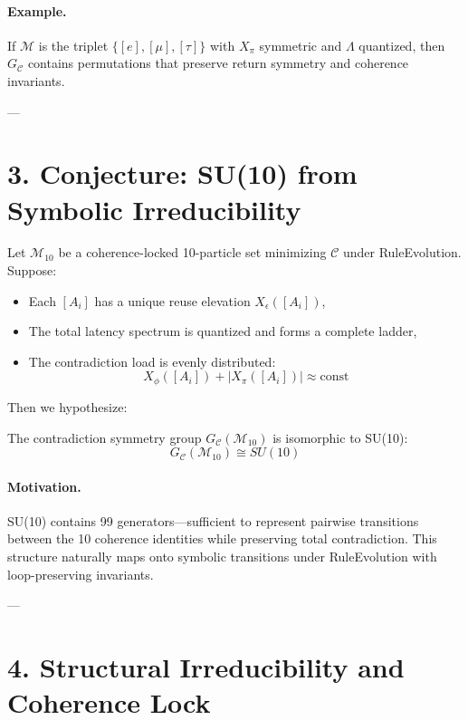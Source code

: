 \paragraph{Example.}
If $\mathcal{M}$ is the triplet $\{[e], [\mu], [\tau]\}$ with $X_\pi$ symmetric and $\Lambda$ quantized, then $G_\mathcal{C}$ contains permutations that preserve return symmetry and coherence invariants.

---

\section{3. Conjecture: SU(10) from Symbolic Irreducibility}
\label{sec:su10-conjecture}

Let $\mathcal{M}_{10}$ be a coherence-locked 10-particle set minimizing $\mathcal{C}$ under RuleEvolution. Suppose:

\begin{itemize}
  \item Each $[A_i]$ has a unique reuse elevation $X_\epsilon([A_i])$,
  \item The total latency spectrum is quantized and forms a complete ladder,
  \item The contradiction load is evenly distributed: 
  \[
  X_\phi([A_i]) + |X_\pi([A_i])| \approx \text{const}
  \]
\end{itemize}

Then we hypothesize:

\begin{conjecture}
The contradiction symmetry group $G_\mathcal{C}(\mathcal{M}_{10})$ is isomorphic to SU(10):
\[
G_\mathcal{C}(\mathcal{M}_{10}) \cong SU(10)
\]
\end{conjecture}

\paragraph{Motivation.}
SU(10) contains 99 generators—sufficient to represent pairwise transitions between the 10 coherence identities while preserving total contradiction. This structure naturally maps onto symbolic transitions under RuleEvolution with loop-preserving invariants.

---

\section{4. Structural Irreducibility and Coherence Lock}
\label{sec:irreducibility}

